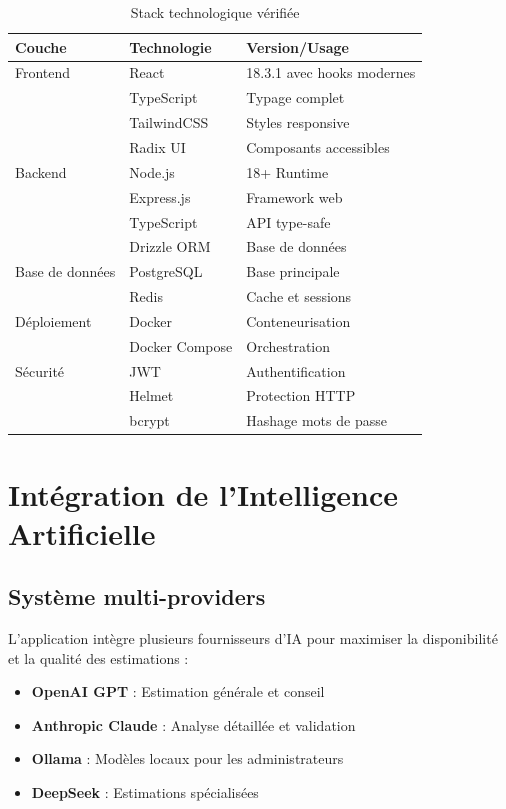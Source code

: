 \documentclass[12pt, a4paper]{report}
\begin{document}
\begin{table}[H]
\centering
\caption{Stack technologique vérifiée}
\begin{tabular}{|l|l|l|}
\hline
\textbf{Couche} & \textbf{Technologie} & \textbf{Version/Usage} \\
\hline
Frontend & React & 18.3.1 avec hooks modernes \\
& TypeScript & Typage complet \\
& TailwindCSS & Styles responsive \\
& Radix UI & Composants accessibles \\
\hline
Backend & Node.js & 18+ Runtime \\
& Express.js & Framework web \\
& TypeScript & API type-safe \\
& Drizzle ORM & Base de données \\
\hline
Base de données & PostgreSQL & Base principale \\
& Redis & Cache et sessions \\
\hline
Déploiement & Docker & Conteneurisation \\
& Docker Compose & Orchestration \\
\hline
Sécurité & JWT & Authentification \\
& Helmet & Protection HTTP \\
& bcrypt & Hashage mots de passe \\
\hline
\end{tabular}
\end{table}

\section{Intégration de l'Intelligence Artificielle}

\subsection{Système multi-providers}

L'application intègre plusieurs fournisseurs d'IA pour maximiser la disponibilité et la qualité des estimations :

\begin{itemize}
    \item \textbf{OpenAI GPT} : Estimation générale et conseil
    \item \textbf{Anthropic Claude} : Analyse détaillée et validation
    \item \textbf{Ollama} : Modèles locaux pour les administrateurs
    \item \textbf{DeepSeek} : Estimations spécialisées
\end{itemize}
\end{document}
